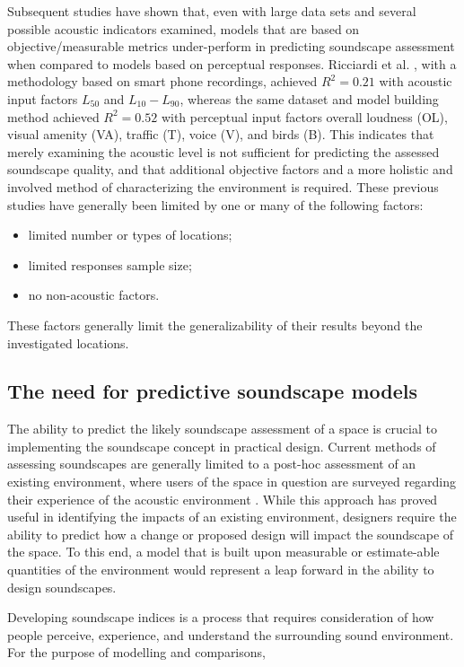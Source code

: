     Subsequent studies have shown that, even with large data sets and several possible acoustic indicators examined, models that are based on objective/measurable metrics under-perform in predicting soundscape assessment when compared to models based on perceptual responses. Ricciardi et al. \cite{Ricciardi2015}, with a methodology based on smart phone recordings, achieved $R^2 = 0.21$ with acoustic input factors $L_50$ and $L_10-L_90$, whereas the same dataset and model building method achieved $R^2 = 0.52$ with perceptual input factors overall loudness (OL), visual amenity (VA), traffic (T), voice (V), and birds (B). This indicates that merely examining the acoustic level is not sufficient for predicting the assessed soundscape quality, and that additional objective factors and a more holistic and involved method of characterizing the environment is required. These previous studies have generally been limited by one or many of the following factors:
    \begin{itemize}
      \item limited number or types of locations;
      \item limited responses sample size;
      \item no non-acoustic factors.
    \end{itemize}
    These factors generally limit the generalizability of their results beyond the investigated locations.

  \subsection{The need for predictive soundscape models}
    The ability to predict the likely soundscape assessment of a space is crucial to implementing the soundscape concept in practical design. Current methods of assessing soundscapes are generally limited to a post-hoc assessment of an existing environment, where users of the space in question are surveyed regarding their experience of the acoustic environment \cite{Engel2018, Zhang2018b}. While this approach has proved useful in identifying the impacts of an existing environment, designers require the ability to predict how a change or proposed design will impact the soundscape of the space. To this end, a model that is built upon measurable or estimate-able quantities of the environment would represent a leap forward in the ability to design soundscapes.

    Developing soundscape indices is a process that requires consideration of how people perceive, experience, and understand the surrounding sound environment. For the purpose of modelling and comparisons,

